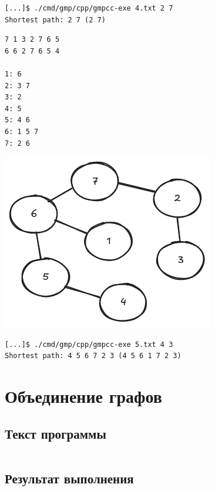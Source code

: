 \documentclass[12pt, a4paper]{article}
\begin{document}
\begin{verbatim}
[...]$ ./cmd/gmp/cpp/gmpcc-exe 4.txt 2 7
Shortest path: 2 7 (2 7)
\end{verbatim}

\vspace{5mm}

\begin{multicols}{2}
\begin{verbatim}
7 1 3 2 7 6 5
6 6 2 7 6 5 4

1: 6
2: 3 7
3: 2
4: 5
5: 4 6
6: 1 5 7
7: 2 6
\end{verbatim}

\columnbreak

\includegraphics[scale=0.5]{5.png}
\end{multicols}

\begin{verbatim}
[...]$ ./cmd/gmp/cpp/gmpcc-exe 5.txt 4 3
Shortest path: 4 5 6 7 2 3 (4 5 6 1 7 2 3)
\end{verbatim}

\newpage

\section{Объединение графов}
\subsection{Текст программы}

\inputminted[firstline=6]{cpp}{/home/mehandes/c/src/github.com/meha4j/math/cmd/gmp/cpp/ucg_add.cc}

\newpage

\subsection{Результат выполнения}
\end{document}
